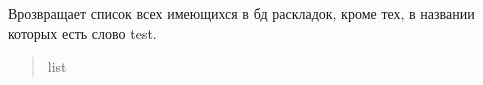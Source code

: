 \documentclass[a4paper,11pt,russian,openany,oneside]{sphinxmanual}
\begin{document}
\begin{savenotes}\begin{fulllineitems}
\label{\detokenize{database_module:database_module.database.take_lk_names_from_lk}}
\pysigstartsignatures
\pysiglinewithargsret
{}
{}
{}
\pysigstopsignatures
\sphinxAtStartPar
Врозвращает список всех имеющихся в бд раскладок,
кроме тех, в названии которых есть слово test.
\begin{quote}\begin{description}
\sphinxAtStartPar
list

\end{description}\end{quote}

\end{fulllineitems}\end{savenotes}

\end{document}
